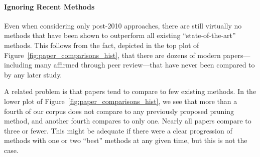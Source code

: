 \paragraph{Ignoring Recent Methods}

Even when considering only post-2010 approaches, there are still virtually no methods that have been shown to outperform all existing ``state-of-the-art'' methods. This follows from the fact, depicted in the top plot of Figure~\ref{fig:paper_comparisons_hist}, that there are dozens of modern papers---including many affirmed through peer review---that have never been compared to by any later study.

A related problem is that papers tend to compare to few existing methods. In the lower plot of Figure~\ref{fig:paper_comparisons_hist}, we see that more than a fourth of our corpus does not compare to any previously proposed pruning method, and another fourth compares to only one. Nearly all papers compare to three or fewer. This might be adequate if there were a clear progression of methods with one or two ``best'' methods at any given time, but this is not the case. %

